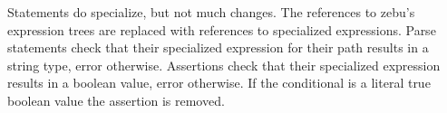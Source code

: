 {	Statements do specialize, but not much changes. The
	references to zebu's expression trees are replaced with references
	to specialized expressions. Parse statements check that their
	specialized expression for their path results in a string type, error
	otherwise. Assertions check that their specialized expression results
	in a boolean value, error otherwise. If the conditional is a literal
	true boolean value the assertion is removed.
}

































